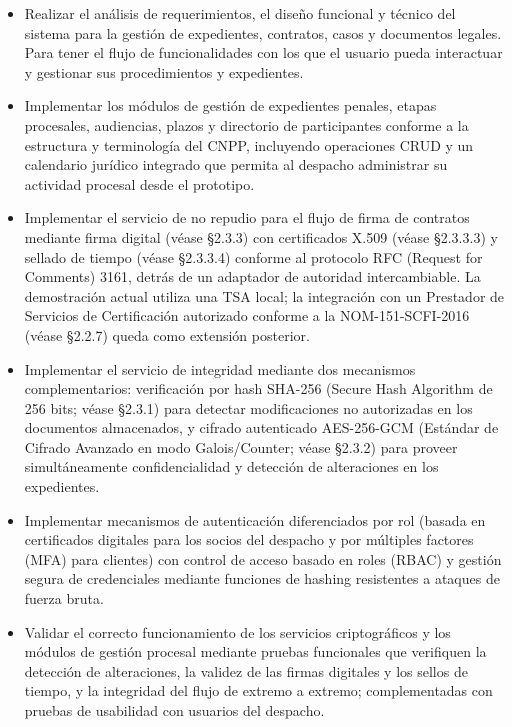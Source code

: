 \begin{itemize}
  \item Realizar el análisis de requerimientos, el diseño funcional y técnico del sistema para la gestión de expedientes, contratos, casos y documentos legales. Para tener el flujo de funcionalidades con los que el usuario pueda interactuar y gestionar sus procedimientos y expedientes.

  \item Implementar los módulos de gestión de expedientes penales, etapas procesales, audiencias, plazos y directorio de participantes conforme a la estructura y terminología del CNPP, incluyendo operaciones CRUD y un calendario jurídico integrado que permita al despacho administrar su actividad procesal desde el prototipo.

  \item Implementar el servicio de no repudio para el flujo de firma de contratos mediante firma digital (véase §2.3.3) con certificados X.509 (véase §2.3.3.3) y sellado de tiempo (véase §2.3.3.4) conforme al protocolo RFC (Request for Comments) 3161, detrás de un adaptador de autoridad intercambiable. La demostración actual utiliza una TSA local; la integración con un Prestador de Servicios de Certificación autorizado conforme a la NOM-151-SCFI-2016 (véase §2.2.7) queda como extensión posterior.

  \item Implementar el servicio de integridad mediante dos mecanismos complementarios: verificación por hash SHA-256 (Secure Hash Algorithm de 256 bits; véase §2.3.1) para detectar modificaciones no autorizadas en los documentos almacenados, y cifrado autenticado AES-256-GCM (Estándar de Cifrado Avanzado en modo Galois/Counter; véase §2.3.2) para proveer simultáneamente confidencialidad y detección de alteraciones en los expedientes.

  \item Implementar mecanismos de autenticación diferenciados por rol (basada en certificados digitales para los socios del despacho y por múltiples factores (MFA) para clientes) con control de acceso basado en roles (RBAC) y gestión segura de credenciales mediante funciones de hashing resistentes a ataques de fuerza bruta.

  \item Validar el correcto funcionamiento de los servicios criptográficos y los módulos de gestión procesal mediante pruebas funcionales que verifiquen la detección de alteraciones, la validez de las firmas digitales y los sellos de tiempo, y la integridad del flujo de extremo a extremo; complementadas con pruebas de usabilidad con usuarios del despacho.
\end{itemize}

